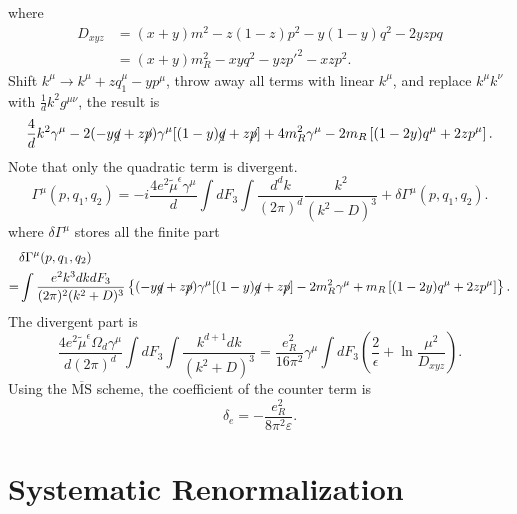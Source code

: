where 
\begin{equation*}
\begin{aligned}
	D_{xyz} &= (x+y)m^2 - z(1-z)p^2- y(1-y)q^2-2yzpq \\
	&=(x+y)m_R^2 - xy q^2- yz p'^2 - xz p^2.
\end{aligned}
\end{equation*}
Shift $k^\mu \rightarrow k^\mu + z q_1^\mu - y p^\mu$, throw away all terms with linear $k^\mu$, and replace $k^\mu k^\nu$ with $\frac{1}{d}k^2 g^{\mu\nu}$, the result is
\begin{equation*}
	\frac{4}{d}k^2\gamma^\mu  -2(-y \cancel{q}+z \cancel{p}) \gamma^{\mu}[(1-y) \cancel q+z \cancel p] +4 m_R^{2} \gamma^{\mu}-2 m_R\left[(1-2 y) q^{\mu}+2 z p^{\mu}\right].
\end{equation*}
Note that only the quadratic term is divergent. 
\begin{equation*}
	\Gamma^\mu(p,q_1,q_2) = -i\frac{4e^2\tilde{\mu}^{\epsilon} \gamma^\mu}{d}  \int dF_3 \int \frac{d^dk}{(2\pi)^d} \frac{k^2}{(k^2-D)^3} + \delta\Gamma^\mu(p,q_1,q_2).
\end{equation*}
where $\delta \Gamma^\mu$ stores all the finite part
\begin{equation*}
\begin{aligned}
	& \delta\Gamma^\mu(p,q_1,q_2) \\
	=& \int \frac{e^2 k^3 dk dF_3}{(2\pi)^2(k^2+D)^3} \left\{(-y \cancel{q}+z \cancel{p}) \gamma^{\mu}[(1-y) \cancel q+z \cancel p] -2 m_R^{2} \gamma^{\mu}+ m_R\left[(1-2 y) q^{\mu}+2 z p^{\mu}\right]\right\}.
\end{aligned}
\end{equation*}
The divergent part is
\begin{equation}
	\frac{4 e^2\tilde{\mu}^{\epsilon} \Omega_d \gamma^\mu}{d(2\pi)^d}\int dF_3 \int \frac{k^{d+1}dk}{(k^2+D)^3}
	= \frac{e_R^2}{16\pi^2} \gamma^\mu \int dF_3 \left(\frac{2}{\epsilon}+\ln\frac{\mu^2}{D_{xyz}}\right).
\end{equation}
Using the $\overline{\mathrm{MS}}$ scheme, the coefficient of the counter term is
\begin{equation}
	\delta_e = -\frac{e_R^2}{8\pi^2\varepsilon}.
\end{equation}



\section{Systematic Renormalization}



